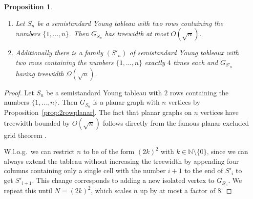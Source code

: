 \documentclass[10pt,a4paper]{article}
\numberwithin{equation}{section}
\newtheorem{proposition}[equation]{Proposition}
\theoremstyle{definition}
\newcommand{\IN}{\mathbb{N}}
\begin{document}
\begin{proposition}
    \label{prop:semistdtreewidth}
    \begin{enumerate}
        \item
            Let $S_n$ be a semistandard Young tableau with two rows containing the numbers $\{1, \ldots, n\}$.
            Then $G_{S_n}$ has treewidth at most $O(\sqrt{n})$.
        \item
            Additionally there is a family $(S'_n)$ of semistandard Young tableaux with two rows containing the numbers $\{1, \ldots, n\}$ exactly $4$ times each and $G_{S'_n}$ having treewidth $\Omega(\sqrt{n})$.
    \end{enumerate}
\end{proposition}
\begin{proof}
    Let $S_n$ be a semistandard Young tableau with $2$ rows containing the numbers $\{1, \ldots, n\}$.
    Then $G_{S_n}$ is a planar graph with $n$ vertices by Proposition~\ref{prop:2rowplanar}.
    The fact that planar graphs on $n$ vertices have treewidth bounded by $O(\sqrt{n})$ follows directly from the famous planar excluded grid theorem \cite{DBLP:journals/jct/RobertsonST94}.

    W.l.o.g.\ we can restrict $n$ to be of the form $(2k)^2$ with $k \in \IN \setminus \{0\}$, since we can always extend the tableau without increasing the treewidth by appending four columns containing only a single cell with the number $i+1$ to the end of $S'_i$ to get $S'_{i+1}$.
    This change corresponds to adding a new isolated vertex to $G_{S'_i}$.
    We repeat this until $N=(2k)^2$, which scales $n$ up by at most a factor of 8.


\end{proof}
\end{document}
